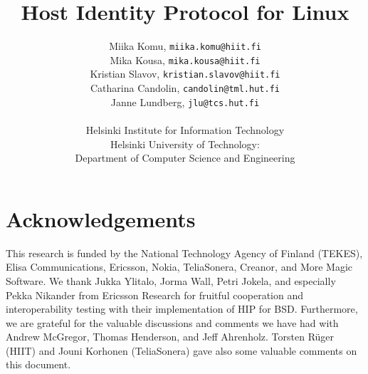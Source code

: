 \documentclass[a4paper,titlepage]{article}
\begin{document}


\title{Host Identity Protocol for Linux}
\author{
        Miika Komu, \texttt{miika.komu@hiit.fi} \\
	Mika Kousa, \texttt{mika.kousa@hiit.fi} \\
	Kristian Slavov, \texttt{kristian.slavov@hiit.fi} \\
        Catharina Candolin, \texttt{candolin@tml.hut.fi} \\
	Janne Lundberg, \texttt{jlu@tcs.hut.fi} \\
	\\
        Helsinki Institute for Information Technology \\       
        Helsinki University of Technology: \\
        Department of Computer Science and Engineering}
\maketitle


\fancyhf{} %
\fancyfoot[C]{ \thepage }
\pagestyle{fancy}

\tableofcontents

\newpage

\section*{Acknowledgements}

This research is funded by the National Technology Agency of Finland
(TEKES), Elisa Communications, Ericsson, Nokia, TeliaSonera, Creanor,
and More Magic Software. We thank Jukka Ylitalo, Jorma Wall, Petri
Jokela, and especially Pekka Nikander from Ericsson Research for
fruitful cooperation and interoperability testing with their
implementation of HIP for BSD. Furthermore, we are grateful for the
valuable discussions and comments we have had with Andrew McGregor,
Thomas Henderson, and Jeff Ahrenholz. Torsten R{\"u}ger (HIIT) and
Jouni Korhonen (TeliaSonera) gave also some valuable comments on this
document.

\newpage

\end{document}

